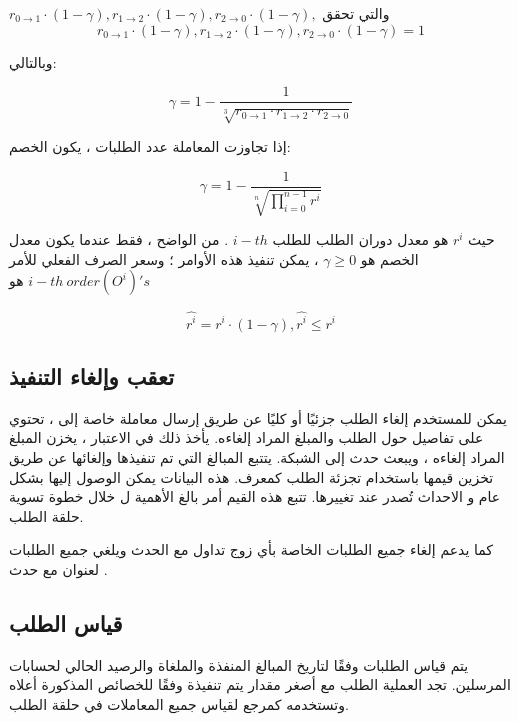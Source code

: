 \documentclass[12pt, a4paper, leqno]{report}
\theoremstyle{plain}
\theoremstyle{definition}
\begin{document}
\begin{multicols}{2}
\begin{otherlanguage}{arabic}
$
r_{0\to1} \cdot (1-\gamma), r_{1\to2} \cdot (1-\gamma), r_{2\to0} \cdot (1-\gamma), 
$
والتي تحقق
\setcounter{equation}{2}
\begin{equation}
\label{1stequation}
r_{0\to1} \cdot (1-\gamma), r_{1\to2} \cdot (1-\gamma),
r_{2\to0} \cdot (1-\gamma) = 1 
\end{equation}

وبالتالي:

\begin{equation}
\label{1stequation}
\gamma = 1 - \frac{1}{\sqrt[3]{r_{0\to1} \cdot r_{1\to2} \cdot r_{2\to0}}}
\end{equation}

إذا تجاوزت المعاملة عدد الطلبات ، يكون الخصم:

\begin{equation}
\label{1stequation}
\gamma = 1 - \frac{1}{\sqrt[n]{\prod^{n-1}_{i=0} r^i}}
\end{equation}

حيث $r^i$ هو معدل دوران الطلب للطلب $i-th$ . من الواضح ، فقط عندما يكون معدل الخصم هو $\gamma \geq 0$ ، يمكن تنفيذ هذه الأوامر ؛ وسعر الصرف الفعلي للأمر $i-th \ order (O^i)'s$ هو

\begin{equation}
\label{1stequation}
\hat{r^i} = r^i \cdot (1-\gamma), \hat{r^i} \leq r^i 
\end{equation}
\end{otherlanguage}

\subsection{تعقب وإلغاء التنفيذ}
يمكن للمستخدم إلغاء الطلب جزئيًا أو كليًا عن طريق إرسال معاملة خاصة إلى  ، تحتوي على تفاصيل حول الطلب والمبلغ المراد إلغاءه. يأخذ  ذلك في الاعتبار ، يخزن المبلغ المراد إلغاءه ، ويبعث حدث  إلى الشبكة. يتتبع  المبالغ التي تم تنفيذها وإلغائها عن طريق تخزين قيمها باستخدام تجزئة الطلب كمعرف. هذه البيانات يمكن الوصول إليها بشكل عام و الاحداث  تُصدر عند تغييرها. تتبع هذه القيم أمر بالغ الأهمية ل  خلال خطوة تسوية حلقة الطلب.

كما يدعم  إلغاء جميع الطلبات الخاصة بأي زوج تداول مع الحدث   ويلغي جميع الطلبات لعنوان مع حدث .

\subsection{قياس الطلب}
يتم قياس الطلبات وفقًا لتاريخ المبالغ المنفذة والملغاة والرصيد الحالي لحسابات المرسلين. تجد العملية الطلب مع أصغر مقدار يتم تنفيذة وفقًا للخصائص المذكورة أعلاه وتستخدمه كمرجع لقياس جميع المعاملات في حلقة الطلب.


\end{multicols}
\end{document}
